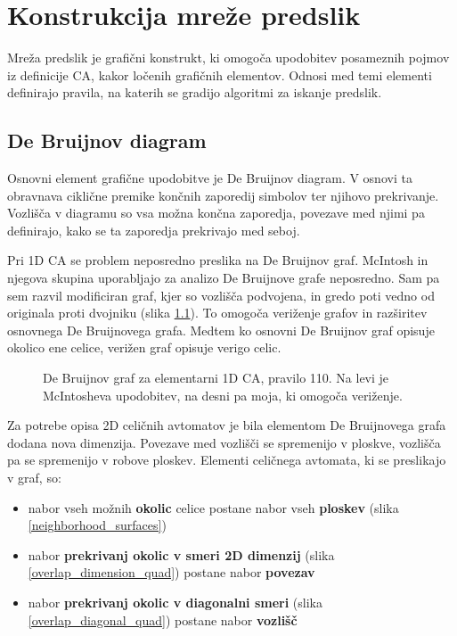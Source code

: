 \documentclass[12pt,a4paper,openany,twoside]{book}
\begin{document}
\chapter{Konstrukcija mreže predslik}

Mreža predslik je grafični konstrukt, ki omogoča upodobitev posameznih pojmov
iz definicije CA, kakor ločenih grafičnih elementov. Odnosi med
temi elementi definirajo pravila, na katerih se gradijo algoritmi za iskanje
predslik.

\section{De Bruijnov diagram}

Osnovni element grafične upodobitve je De Bruijnov diagram. V osnovi ta obravnava
ciklične premike končnih zaporedij simbolov ter njihovo prekrivanje. Vozlišča v
diagramu so vsa možna končna zaporedja, povezave med njimi pa definirajo, kako se
ta zaporedja prekrivajo med seboj.

Pri 1D CA se problem neposredno preslika na De Bruijnov graf. McIntosh
in njegova skupina uporabljajo za analizo De Bruijnove grafe neposredno. Sam pa sem
razvil modificiran graf, kjer so vozlišča podvojena, in gredo poti vedno od originala
proti dvojniku (slika \ref{de_bruijn_diagram}).
To omogoča veriženje grafov in razširitev osnovnega De Bruijnovega grafa.
Medtem ko osnovni De Bruijnov graf opisuje okolico ene celice, verižen graf opisuje verigo celic.

\begin{figure}[htb]
\centerline{}
\caption[De Bruijnov graf, pravilo 110.]
{De Bruijnov graf za elementarni 1D CA, pravilo 110.
Na levi je McIntosheva upodobitev, na desni pa moja, ki omogoča veriženje.}
\label{de_bruijn_diagram}
\end{figure}

Za potrebe opisa 2D celičnih avtomatov je bila elementom
De Bruijnovega grafa dodana nova dimenzija. Povezave med vozlišči se spremenijo
v ploskve, vozlišča pa se spremenijo v robove ploskev.
Elementi celičnega avtomata, ki se preslikajo v graf, so:
\begin{itemize}[noitemsep,nolistsep]
\item nabor vseh možnih \textbf{okolic} celice postane nabor vseh \textbf{ploskev} (slika \ref{neighborhood_surfaces})
\item nabor \textbf{prekrivanj okolic v smeri 2D dimenzij} (slika \ref{overlap_dimension_quad}) postane nabor \textbf{povezav}
\item nabor \textbf{prekrivanj okolic v diagonalni smeri} (slika \ref{overlap_diagonal_quad}) postane nabor \textbf{vozlišč}
\end{itemize}
\end{document}
